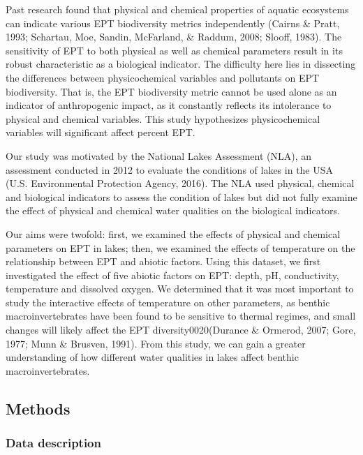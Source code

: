 \documentclass[]{article}
\begin{document}
Past research found that physical and chemical properties of aquatic
ecosystems can indicate various EPT biodiversity metrics independently
(Cairns \& Pratt, 1993; Schartau, Moe, Sandin, McFarland, \& Raddum,
2008; Slooff, 1983). The sensitivity of EPT to both physical as well as
chemical parameters result in its robust characteristic as a biological
indicator. The difficulty here lies in dissecting the differences
between physicochemical variables and pollutants on EPT biodiversity.
That is, the EPT biodiversity metric cannot be used alone as an
indicator of anthropogenic impact, as it constantly reflects its
intolerance to physical and chemical variables. This study hypothesizes
physicochemical variables will significant affect percent EPT.

Our study was motivated by the National Lakes Assessment (NLA), an
assessment conducted in 2012 to evaluate the conditions of lakes in the
USA (U.S. Environmental Protection Agency, 2016). The NLA used physical,
chemical and biological indicators to assess the condition of lakes but
did not fully examine the effect of physical and chemical water
qualities on the biological indicators.

Our aims were twofold: first, we examined the effects of physical and
chemical parameters on EPT in lakes; then, we examined the effects of
temperature on the relationship between EPT and abiotic factors. Using
this dataset, we first investigated the effect of five abiotic factors
on EPT: depth, pH, conductivity, temperature and dissolved oxygen. We
determined that it was most important to study the interactive effects
of temperature on other parameters, as benthic macroinvertebrates have
been found to be sensitive to thermal regimes, and small changes will
likely affect the EPT diversity0020(Durance \& Ormerod, 2007; Gore,
1977; Munn \& Brusven, 1991). From this study, we can gain a greater
understanding of how different water qualities in lakes affect benthic
macroinvertebrates.

\subsection{Methods}\label{methods}

\subsubsection{Data description}\label{data-description}
\end{document}
